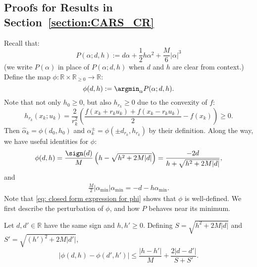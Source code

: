 \subsection{Proofs for Results in Section~\ref{section:CARS_CR}}
Recall that:
\begin{equation*}
    P(\alpha; d, h) := d\alpha + \frac{1}{2}h\alpha^2 + \frac{M}{6}|\alpha|^3
\end{equation*}
(we write $P(\alpha)$ in place of $P(\alpha; d, h)$ when $d$ and $h$ are clear from context.) Define the map $\phi: \mathbb{R}\times\mathbb{R}_{\geq 0} \rightarrow \mathbb{R}$:
\begin{equation*}
    \phi(d, h) := \argmin_{\alpha}P(\alpha; d, h).
\end{equation*}
Note that not only $h_0 \geq 0$, but also $h_{r_k} \geq 0$ due to the convexity of $f$:
\begin{equation*}
    h_{r_k}(x_k; u_k) = \frac{2}{r_k^2}\left(\frac{f(x_k + r_k u_k) + f(x_k - r_k u_k)}{2} - f(x_k)\right) \geq 0.
\end{equation*}
Then $\hat{\alpha}_k = \phi(d_0, h_0)$ and $\alpha_k^{\pm} = \phi(\pm d_{r_k}, h_{r_k})$ by their definition.
Along the way, we have useful identities for $\phi$:
\begin{align}\label{eq: closed form expression for phi}
    \phi(d, h) = \frac{\sign(d)}{M}\left(h - \sqrt{h^2 + 2M|d|}\right) = \frac{-2d}{h + \sqrt{h^2 + 2M|d|}},
\end{align}
and
\begin{align}\label{eq: alpha Useful_ID}
    \frac{M}{2}|\alpha_{\mathrm{min}}|\alpha_{\mathrm{min}} = -d - h\alpha_{\mathrm{min}}.
\end{align}
Note that \eqref{eq: closed form expression for phi} shows that $\phi$ is well-defined.
We first describe the perturbation of $\phi$, and how $P$ behaves near its minimum.
\begin{lemma}\label{lemma: perturbation of phi}
    Let $d, d' \in \mathbb{R}$ have the same sign and $h, h' \geq 0$.
    Defining $S = \sqrt{h^2 + 2M|d|}$ and $S' = \sqrt{(h')^2 + 2M|d'|}$,
    \begin{equation}
        |\phi(d, h) - \phi(d', h')|
        \leq \frac{|h-h'|}{M} + \frac{2|d-d'|}{S + S'}.
    \end{equation}
\end{lemma}
